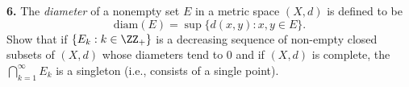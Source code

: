 \documentclass{homework}
\begin{document}
\begin{solution}
%
%
%
\end{solution}

\newcommand{\diam}{\mathrm{diam}}
{\bf 6.} The \emph{diameter} of a nonempty set $E$ in a metric space $(X,d)$ is defined to be
$$
  \diam(E) = \sup\{d(x,y):x,y \in E\}.
$$ 
Show that if $\{E_k:k\in\ZZ_+\}$ is a decreasing sequence of non-empty closed subsets of $(X,d)$
whose diameters tend to $0$ and if $(X,d)$ is complete, the $\bigcap_{k=1}^\infty E_k$ is a singleton (i.e., consists of a single point).
\end{document}
